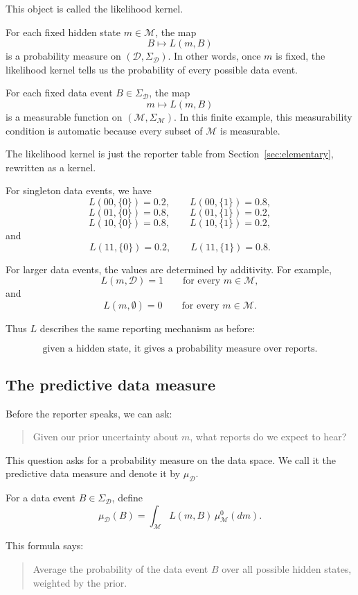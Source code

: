 \documentclass[11pt]{article}
\newcommand{\M}{\mathcal{M}}
\newcommand{\D}{\mathcal{D}}
\newcommand{\SigmaM}{\Sigma_{\M}}
\newcommand{\SigmaD}{\Sigma_{\D}}
\newcommand{\muMzero}{\mu^0_{\M}}
\newcommand{\muD}{\mu_{\D}}
\begin{document}
This object is called the likelihood kernel.

For each fixed hidden state \(m\in\M\), the map
\[
    B\longmapsto L(m,B)
\]
is a probability measure on \((\D,\SigmaD)\). In other words, once \(m\) is fixed, the likelihood kernel tells us the probability of every possible data event.

For each fixed data event \(B\in\SigmaD\), the map
\[
    m\longmapsto L(m,B)
\]
is a measurable function on \((\M,\SigmaM)\). In this finite example, this measurability condition is automatic because every subset of \(\M\) is measurable.

The likelihood kernel is just the reporter table from Section~\ref{sec:elementary}, rewritten as a kernel.

For singleton data events, we have
\[
    L(00,\{0\})=0.2,
    \qquad
    L(00,\{1\})=0.8,
\]
\[
    L(01,\{0\})=0.8,
    \qquad
    L(01,\{1\})=0.2,
\]
\[
    L(10,\{0\})=0.8,
    \qquad
    L(10,\{1\})=0.2,
\]
and
\[
    L(11,\{0\})=0.2,
    \qquad
    L(11,\{1\})=0.8.
\]

For larger data events, the values are determined by additivity. For example,
\[
    L(m,\D)=1
    \qquad
    \text{for every }m\in\M,
\]
and
\[
    L(m,\emptyset)=0
    \qquad
    \text{for every }m\in\M.
\]

Thus \(L\) describes the same reporting mechanism as before:

\[
    \text{given a hidden state, it gives a probability measure over reports.}
\]

\subsection{The predictive data measure}

Before the reporter speaks, we can ask:

\begin{quote}
    Given our prior uncertainty about \(m\), what reports do we expect to hear?
\end{quote}

This question asks for a probability measure on the data space. We call it the predictive data measure and denote it by \(\muD\).

For a data event \(B\in\SigmaD\), define
\[
    \muD(B)
    =
    \int_{\M} L(m,B)\,\muMzero(dm).
\]

This formula says:

\begin{quote}
    Average the probability of the data event \(B\) over all possible hidden states, weighted by the prior.
\end{quote}
\end{document}
